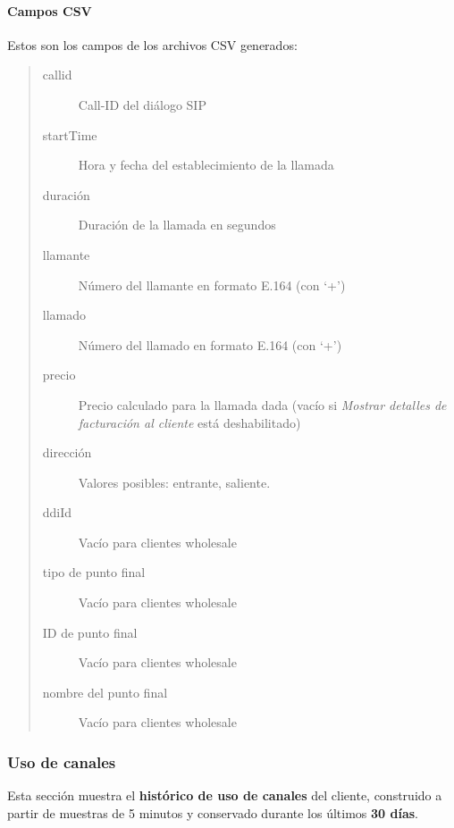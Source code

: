 \documentclass[letterpaper,10pt,spanish]{sphinxmanual}
\begin{document}
\paragraph{Campos CSV}
\label{administration_portal/client/wholesale/calls/call_csv_schedulers:csv-fields}
Estos son los campos de los archivos CSV generados:
\begin{quote}
\begin{description}
\item[{callid}] \leavevmode
Call-ID del diálogo SIP

\item[{startTime}] \leavevmode
Hora y fecha del establecimiento de la llamada

\item[{duración}] \leavevmode
Duración de la llamada en segundos

\item[{llamante}] \leavevmode
Número del llamante en formato E.164 (con `+')

\item[{llamado}] \leavevmode
Número del llamado en formato E.164 (con `+')

\item[{precio}] \leavevmode
Precio calculado para la llamada dada (vacío si \emph{Mostrar detalles de facturación al cliente} está deshabilitado)

\item[{dirección}] \leavevmode
Valores posibles: entrante, saliente.

\item[{ddiId}] \leavevmode
Vacío para clientes wholesale

\item[{tipo de punto final}] \leavevmode
Vacío para clientes wholesale

\item[{ID de punto final}] \leavevmode
Vacío para clientes wholesale

\item[{nombre del punto final}] \leavevmode
Vacío para clientes wholesale

\end{description}
\end{quote}


\subsubsection{Uso de canales}
\label{administration_portal/client/wholesale/calls/channel_usage:channel-usage}\label{administration_portal/client/wholesale/calls/channel_usage::doc}
Esta sección muestra el \textbf{histórico de uso de canales} del cliente, construido a partir de muestras de 5 minutos y conservado durante los últimos \textbf{30 días}.
\end{document}
